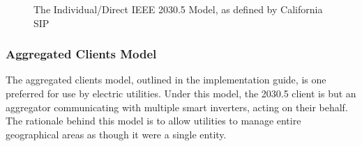 \begin{figure}[H]
    \begin{center}
        \caption{The Individual/Direct IEEE 2030.5 Model, as defined by California SIP}
    \end{center}
\end{figure}


\subsubsection{Aggregated Clients Model}
The aggregated clients model, outlined in the implementation guide, is one preferred for use by electric utilities. Under this model, the 2030.5 client is but an aggregator communicating with multiple smart inverters, acting on their behalf.
The rationale behind this model is to allow utilities to manage entire geographical areas as though it were a single entity.


